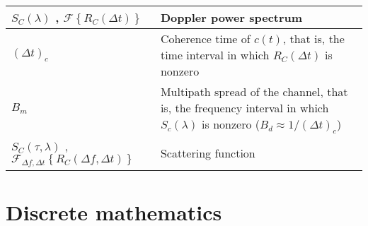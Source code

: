 \documentclass{article}
\begin{document}
\begin{xltabular}{\textwidth}{XX}
	\(S_C(\lambda)\) \cite{proakisDigitalCommunications2007}, \(\mathcal{F}\left\{ R_C (\Delta t) \right\}\) \cite{goldsmithWirelessCommunications2005}                                                & Doppler power spectrum                                                                                                                                                          \\ \hline
	\((\Delta t)_c\)                                                                                                                                                                                   & Coherence time of \(c(t)\), that is, the time interval in which \(R_C(\Delta t)\) is nonzero \cite{proakisDigitalCommunications2007}                                            \\ \hline
	\(B_m\)                                                                                                                                                                                            & Multipath spread of the channel, that is, the frequency interval in which \(S_c(\lambda)\) is nonzero (\(B_d \approx 1/(\Delta t)_c \)) \cite{proakisDigitalCommunications2007} \\ \hline
	\(S_C(\tau, \lambda)\) \cite{proakisDigitalCommunications2007}, \(\mathcal{F}_{\Delta f, \Delta t}\left\{ R_C (\Delta f, \Delta t) \right\}\) \cite{goldsmithWirelessCommunications2005}           & Scattering function                                                                                                                                                             \\ \hline
\end{xltabular}

\section{Discrete mathematics}
\end{document}
